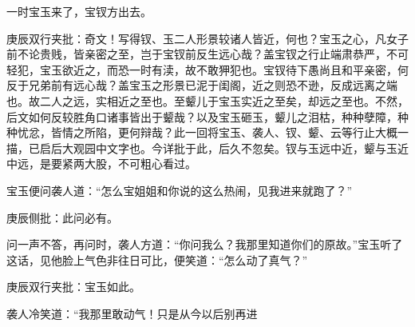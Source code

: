 \begin{parag}
    一时宝玉来了，宝钗方出去。\begin{note}庚辰双行夹批：奇文！写得钗、玉二人形景较诸人皆近，何也？宝玉之心，凡女子前不论贵贱，皆亲密之至，岂于宝钗前反生远心哉？盖宝钗之行止端肃恭严，不可轻犯，宝玉欲近之，而恐一时有渎，故不敢狎犯也。宝钗待下愚尚且和平亲密，何反于兄弟前有远心哉？盖宝玉之形景已泥于闺阁，近之则恐不逊，反成远离之端也。故二人之远，实相近之至也。至颦儿于宝玉实近之至矣，却远之至也。不然，后文如何反较胜角口诸事皆出于颦哉？以及宝玉砸玉，颦儿之泪枯，种种孽障，种种忧忿，皆情之所陷，更何辩哉？此一回将宝玉、袭人、钗、颦、云等行止大概一描，已启后大观园中文字也。今详批于此，后久不忽矣。钗与玉远中近，颦与玉近中远，是要紧两大股，不可粗心看过。\end{note}宝玉便问袭人道：“怎么宝姐姐和你说的这么热闹，见我进来就跑了？”\begin{note}庚辰侧批：此问必有。\end{note}问一声不答，再问时，袭人方道：“你问我么？我那里知道你们的原故。”宝玉听了这话，见他脸上气色非往日可比，便笑道：“怎么动了真气？”\begin{note}庚辰双行夹批：宝玉如此。\end{note}袭人冷笑道：“我那里敢动气！只是从今以后别再进
\end{parag}
